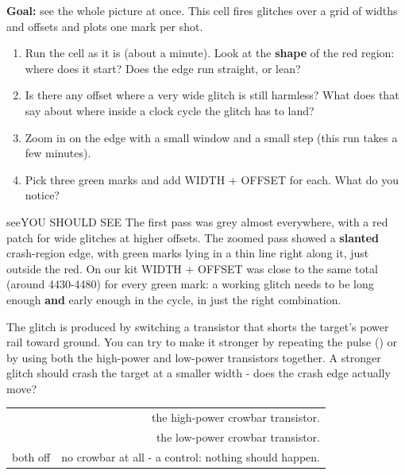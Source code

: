 \documentclass[11pt,letterpaper]{article}
\begin{document}
\textbf{Goal:} see the whole picture at once. This cell fires glitches over a grid of widths and offsets and plots one
mark per shot.

\begin{enumerate}[label=\arabic*.,leftmargin=1.8em,itemsep=2pt,topsep=2pt,parsep=0pt,start=1]
\item Run the cell as it is (about a minute). Look at the \textbf{shape} of the red region: where does it start? Does the edge run straight, or lean?
\item Is there any offset where a very wide glitch is still harmless? What does that say about where inside a clock cycle the glitch has to land?
\item Zoom in on the edge with a small window and a small step (this run takes a few minutes).
\item Pick three green marks and add WIDTH + OFFSET for each. What do you notice?
\end{enumerate}

\begin{guidecallout}{see}{YOU SHOULD SEE}
The first pass was grey almost everywhere, with a red patch for wide glitches at higher offsets. The zoomed pass
showed a \textbf{slanted} crash-region edge, with green marks lying in a thin line right along it, just outside the
red. On our kit WIDTH + OFFSET was close to the same total (around 4430-4480) for every green mark: a working glitch
needs to be long enough \textbf{and} early enough in the cycle, in just the right combination.
\end{guidecallout}


The glitch is produced by switching a transistor that shorts the target's power rail toward ground. You can try to
make it stronger by repeating the pulse () or by using both the high-power and low-power transistors
together. A stronger glitch should crash the target at a smaller width - does the crash edge actually move?

{\small{}
\begin{longtable}{|R{0.1884}|R{0.8116}|}
\hline
{} &  \\ \hline
\endhead
{} & the high-power crowbar transistor. \\ \hline
{} & the low-power crowbar transistor. \\ \hline
both off & no crowbar at all - a control: nothing should happen. \\ \hline
\end{longtable}}
\end{document}
